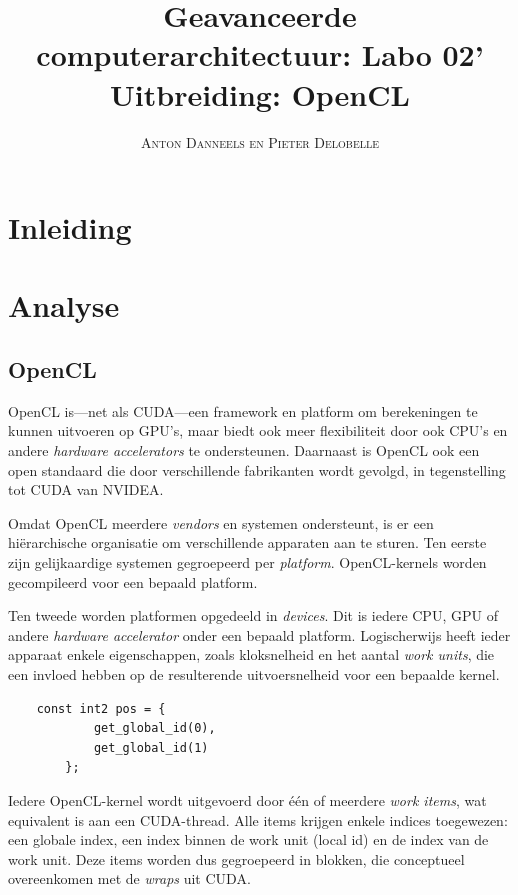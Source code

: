\documentclass[twocolumn, a4paper]{article}
\begin{document}
\title{Geavanceerde computerarchitectuur: Labo 02' \\ 
\large{Uitbreiding: OpenCL}}
\author{\textsc{Anton Danneels en Pieter Delobelle}}
\date{}
\maketitle

\section{Inleiding}


\section{Analyse}

\subsection{OpenCL}
OpenCL is---net als CUDA---een framework en platform om berekeningen te kunnen uitvoeren op GPU's, maar biedt ook meer flexibiliteit door ook CPU's en andere \emph{hardware accelerators} te ondersteunen. Daarnaast is OpenCL ook een open standaard die door verschillende fabrikanten wordt gevolgd, in tegenstelling tot CUDA van NVIDEA.

Omdat OpenCL meerdere \emph{vendors} en systemen ondersteunt, is er een hiërarchische organisatie om verschillende apparaten aan te sturen. Ten eerste zijn gelijkaardige systemen gegroepeerd per \emph{platform}. OpenCL-kernels worden gecompileerd voor een bepaald platform. 

Ten tweede worden platformen opgedeeld in \emph{devices}. Dit is iedere CPU, GPU of andere \emph{hardware accelerator} onder een bepaald platform. Logischerwijs heeft ieder apparaat enkele eigenschappen, zoals kloksnelheid en het aantal \emph{work units}, die een invloed hebben op de resulterende uitvoersnelheid voor een bepaalde kernel.

\begin{verbatim}
    const int2 pos = {
            get_global_id(0), 
            get_global_id(1)
        };
    \end{verbatim}
    \label{c:index}

Iedere OpenCL-kernel wordt uitgevoerd door één of meerdere \emph{work items}, wat equivalent is aan een CUDA-thread. Alle items krijgen enkele indices toegewezen: een globale index, een index binnen de work unit (local id) en de index van de work unit. Deze items worden dus gegroepeerd in blokken, die conceptueel overeenkomen met de \emph{wraps} uit CUDA. 
\end{document}
